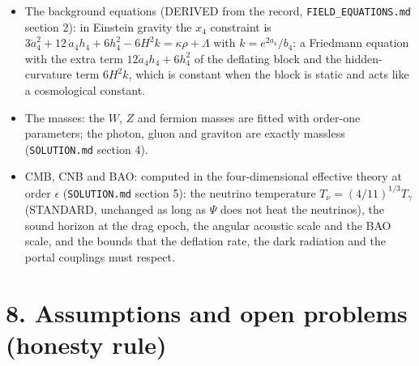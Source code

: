 \documentclass[11pt]{article}
\begin{document}
\begin{itemize}
\item The background equations (DERIVED from the record, \texttt{FIELD\_\allowbreak{}EQUATIONS.\allowbreak{}md} section 2): in Einstein gravity the $x_4$ constraint is $3\dot a_4^2 + 12\,\dot a_4 h_4 + 6h_4^2 - 6H^2 k = \kappa\rho + \Lambda$ with $k = e^{2a_4}/b_4$: a Friedmann equation with the extra term $12\dot a_4 h_4 + 6h_4^2$ of the deflating block and the hidden-curvature term $6H^2k$, which is constant when the block is static and acts like a cosmological constant.
\item The masses: the $W$, $Z$ and fermion masses are fitted with order-one parameters; the photon, gluon and graviton are exactly massless (\texttt{SOLUTION.\allowbreak{}md} section 4).
\item CMB, CNB and BAO: computed in the four-dimensional effective theory at order $\epsilon$ (\texttt{SOLUTION.\allowbreak{}md} section 5): the neutrino temperature $T_\nu = (4/11)^{1/3}T_\gamma$ (STANDARD, unchanged as long as $\Psi$ does not heat the neutrinos), the sound horizon at the drag epoch, the angular acoustic scale and the BAO scale, and the bounds that the deflation rate, the dark radiation and the portal couplings must respect.
\end{itemize}

\section*{8. Assumptions and open problems (honesty rule)}
\end{document}
